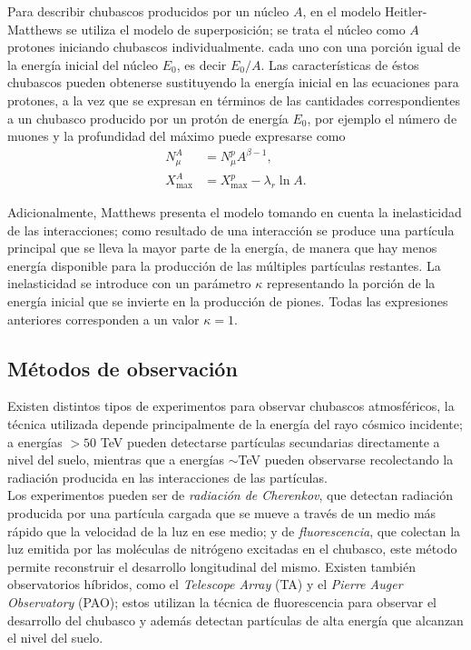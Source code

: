 	Para describir chubascos producidos por un núcleo $A$, en el modelo Heitler-Matthews se utiliza el modelo de superposición; se trata el núcleo como $A$ protones iniciando chubascos individualmente. cada uno con una porción igual de la energía inicial del núcleo $E_0$, es decir $E_0/A$. Las características de éstos chubascos pueden obtenerse sustituyendo la energía inicial en las ecuaciones para protones, a la vez que se expresan en términos de las cantidades correspondientes a un chubasco producido por un protón de energía $E_0$, por ejemplo el número de muones y la profundidad del máximo puede expresarse como
	\begin{align}
	N_{\mu}^{A}		  	&= N_{\mu}^{p} A^{\beta -1}, \\ 
	X_{\text{max}}^{A} 	&= X_{\text{max}}^{p} - \lambda_r \ln A.
	\end{align}

	Adicionalmente, Matthews presenta el modelo tomando en cuenta la inelasticidad de las interacciones; como resultado de una interacción se produce una partícula principal que se lleva la mayor parte de la energía, de manera que hay menos energía disponible para la producción de las múltiples partículas restantes. La inelasticidad se introduce con un parámetro $\kappa$ representando la porción de la energía inicial que se invierte en la producción de piones. Todas las expresiones anteriores corresponden a un valor $\kappa = 1$.

	
	\subsection{Métodos de observación}
	Existen distintos tipos de experimentos para observar chubascos atmosféricos, la técnica utilizada depende principalmente de la energía del rayo cósmico incidente; a energías $>50$ TeV pueden detectarse partículas secundarias directamente a nivel del suelo, mientras que a energías $\sim$TeV pueden observarse recolectando la radiación producida en las interacciones de las partículas. \\
	
	Los experimentos pueden ser de \textit{radiación de Cherenkov}, que detectan radiación producida por una partícula cargada que se mueve a través de un medio más rápido que la velocidad de la luz en ese medio; y de \textit{fluorescencia}, que colectan la luz emitida por las moléculas de nitrógeno excitadas en el chubasco, este método permite reconstruir el desarrollo longitudinal del mismo. Existen también observatorios híbridos, como el \textit{Telescope Array} (TA) y el \textit{Pierre Auger Observatory} (PAO); estos utilizan la técnica de fluorescencia para observar el desarrollo del chubasco y además detectan partículas de alta energía que alcanzan el nivel del suelo.
	
